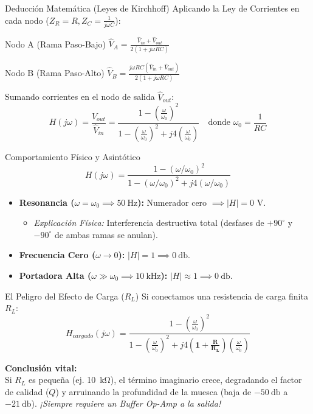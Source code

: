 \documentclass[aspectratio=169, 10pt]{beamer}
\begin{document}
\begin{frame}{Deducción Matemática (Leyes de Kirchhoff)}
    Aplicando la Ley de Corrientes en cada nodo ($Z_R=R, Z_C=\frac{1}{j\omega C}$):
    \vspace{0.2cm}
    \begin{block}{Nodo A (Rama Paso-Bajo)}
        $\hat{V}_A = \frac{\hat{V}_{in} + \hat{V}_{out}}{2(1 + j\omega RC)}$
    \end{block}
    \begin{block}{Nodo B (Rama Paso-Alto)}
        $\hat{V}_B = \frac{j\omega RC (\hat{V}_{in} + \hat{V}_{out})}{2(1 + j\omega RC)}$
    \end{block}
    \vspace{0.2cm}
    Sumando corrientes en el nodo de salida $\hat{V}_{out}$:
    $$H(j\omega) = \frac{\hat{V}_{out}}{\hat{V}_{in}} = \frac{1 - \left(\frac{\omega}{\omega_0}\right)^2}{1 - \left(\frac{\omega}{\omega_0}\right)^2 + j 4 \left(\frac{\omega}{\omega_0}\right)} \quad \text{donde } \omega_0 = \frac{1}{RC}$$
\end{frame}

\begin{frame}{Comportamiento Físico y Asintótico}
    $$H(j\omega) = \frac{1 - (\omega/\omega_0)^2}{1 - (\omega/\omega_0)^2 + j 4 (\omega/\omega_0)}$$
    \vspace{0.2cm}
    \begin{itemize}
        \setlength{\itemsep}{8pt}
        \item \textbf{Resonancia ($\omega = \omega_0 \implies \qty{50}{\hertz}$):} Numerador cero $\implies \vert{}H\vert{} = 0\text{ V}$.
        \begin{itemize}
            \item \textit{Explicación Física:} Interferencia destructiva total (desfases de $+90^\circ$ y $-90^\circ$ de ambas ramas se anulan).
        \end{itemize}
        \item \textbf{Frecuencia Cero ($\omega \to 0$):} $\vert{}H\vert{} = 1 \implies \qty{0}{\decibel}$.
        \item \textbf{Portadora Alta ($\omega \gg \omega_0 \implies \qty{10}{\kilo\hertz}$):} $\vert{}H\vert{} \approx 1 \implies \qty{0}{\decibel}$.
    \end{itemize}
\end{frame}

\begin{frame}{El Peligro del Efecto de Carga ($R_L$)}
    Si conectamos una resistencia de carga finita $R_L$:
    $$H_{cargado}(j\omega) = \frac{1 - \left(\frac{\omega}{\omega_0}\right)^2}{1 - \left(\frac{\omega}{\omega_0}\right)^2 + j 4 \mathbf{\left(1 + \frac{R}{R_L}\right)} \left(\frac{\omega}{\omega_0}\right)}$$
    
    \vspace{0.3cm}
    \textbf{Conclusión vital:} \\
    Si $R_L$ es pequeña (ej. \qty{10}{\kilo\ohm}), el término imaginario crece, degradando el factor de calidad ($Q$) y arruinando la profundidad de la muesca (baja de $\qty{-50}{\decibel}$ a $\qty{-21}{\decibel}$). \textit{¡Siempre requiere un Buffer Op-Amp a la salida!}
\end{frame}
\end{document}

